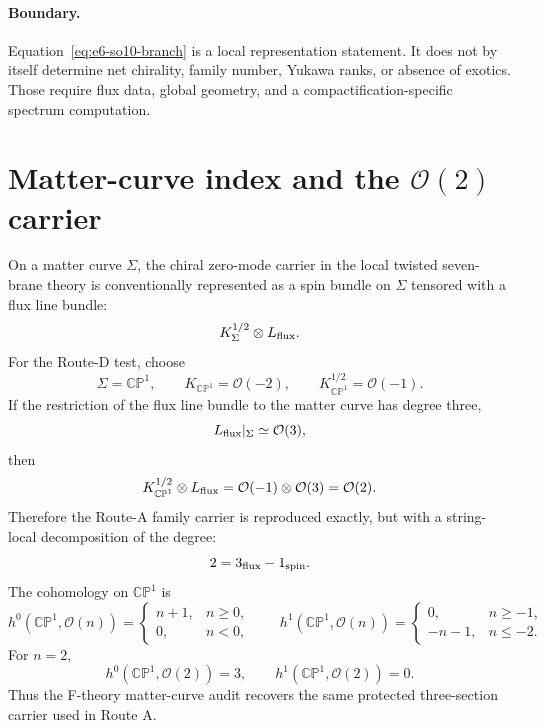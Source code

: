 \documentclass[11pt]{article}
\newcommand{\CP}{\mathbb{CP}}
\newcommand{\cO}{\mathcal{O}}
\begin{document}
\paragraph{Boundary.}
Equation~\eqref{eq:e6-so10-branch} is a local representation statement.  It
does not by itself determine net chirality, family number, Yukawa ranks, or
absence of exotics.  Those require flux data, global geometry, and a
compactification-specific spectrum computation.

\section{\texorpdfstring{Matter-curve index and the \(\cO(2)\) carrier}{Matter-curve index and the O(2) carrier}}

On a matter curve \(\Sigma\), the chiral zero-mode carrier in the local
twisted seven-brane theory is conventionally represented as a spin bundle on
\(\Sigma\) tensored with a flux line bundle:
\begin{equation}
  K_\Sigma^{1/2}\otimes L_{\rm flux}.
  \label{eq:spin-flux-carrier}
\end{equation}
For the Route-D test, choose
\begin{equation}
  \Sigma=\CP^1,\qquad
  K_{\CP^1}=\cO(-2),\qquad
  K_{\CP^1}^{1/2}=\cO(-1).
\end{equation}
If the restriction of the flux line bundle to the matter curve has degree
three,
\begin{equation}
  L_{\rm flux}|_\Sigma\simeq \cO(3),
\end{equation}
then
\begin{equation}
  K_{\CP^1}^{1/2}\otimes L_{\rm flux}
  =
  \cO(-1)\otimes\cO(3)
  =
  \cO(2).
  \label{eq:o2-from-flux}
\end{equation}
Therefore the Route-A family carrier is reproduced exactly, but with a
string-local decomposition of the degree:
\begin{equation}
  2=3_{\rm flux}-1_{\rm spin}.
\end{equation}
The cohomology on \(\CP^1\) is
\begin{equation}
  h^0(\CP^1,\cO(n))=
  \begin{cases}
    n+1,& n\ge0,\\
    0,& n<0,
  \end{cases}
  \qquad
  h^1(\CP^1,\cO(n))=
  \begin{cases}
    0,& n\ge -1,\\
    -n-1,& n\le -2.
  \end{cases}
\end{equation}
For \(n=2\),
\begin{equation}
  h^0(\CP^1,\cO(2))=3,\qquad
  h^1(\CP^1,\cO(2))=0.
\end{equation}
Thus the F-theory matter-curve audit recovers the same protected
three-section carrier used in Route A.
\end{document}
